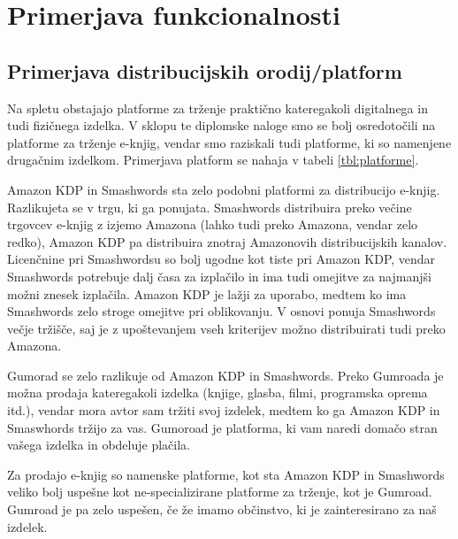 \documentclass[a4paper, 12pt]{book}
\begin{document}
\section{Primerjava funkcionalnosti}

\subsection{Primerjava distribucijskih orodij/platform}
Na spletu obstajajo platforme za trženje praktično kateregakoli digitalnega in tudi fizičnega izdelka. V sklopu te diplomske naloge smo se bolj osredotočili na platforme za trženje e-knjig, vendar smo raziskali tudi platforme, ki so namenjene drugačnim izdelkom. Primerjava platform se nahaja v tabeli \ref{tbl:platforme}.

Amazon KDP in Smashwords sta zelo podobni platformi za distribucijo e-knjig. Razlikujeta se v trgu, ki ga ponujata. Smashwords distribuira preko večine trgovcev e-knjig z izjemo Amazona (lahko tudi preko Amazona, vendar zelo redko), Amazon KDP pa distribuira znotraj Amazonovih distribucijskih kanalov. Licenčnine pri Smashwordsu so bolj ugodne kot tiste pri Amazon KDP, vendar Smashwords potrebuje dalj časa za izplačilo in ima tudi omejitve za najmanjši možni znesek izplačila. Amazon KDP je lažji za uporabo, medtem ko ima Smashwords zelo stroge omejitve pri oblikovanju. V osnovi ponuja Smashwords večje tržišče, saj je z upoštevanjem vseh kriterijev možno distribuirati tudi preko Amazona. 

Gumorad se zelo razlikuje od Amazon KDP in Smashwords. Preko Gumroada je možna prodaja kateregakoli izdelka (knjige, glasba, filmi, programska oprema itd.), vendar mora avtor sam tržiti svoj izdelek, medtem ko ga Amazon KDP in Smaswhords tržijo za vas. Gumoroad je platforma, ki vam naredi domačo stran vašega izdelka in obdeluje plačila. 

Za prodajo e-knjig so namenske platforme, kot sta Amazon KDP in Smashwords veliko bolj uspešne kot ne-specializirane platforme za trženje, kot je Gumroad. Gumroad je pa zelo uspešen, če že imamo občinstvo, ki je zainteresirano za naš izdelek.
\end{document}
